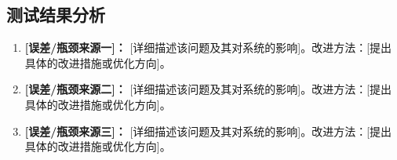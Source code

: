 \documentclass[UTF-8,zihao=-4]{ctexart}
\begin{document}

\subsection{测试结果分析}
    \begin{enumerate}
        \item \textbf{[误差/瓶颈来源一]：} [详细描述该问题及其对系统的影响]。改进方法：[提出具体的改进措施或优化方向]。
        \item \textbf{[误差/瓶颈来源二]：} [详细描述该问题及其对系统的影响]。改进方法：[提出具体的改进措施或优化方向]。
        \item \textbf{[误差/瓶颈来源三]：} [详细描述该问题及其对系统的影响]。改进方法：[提出具体的改进措施或优化方向]。
    \end{enumerate}
\end{document}
